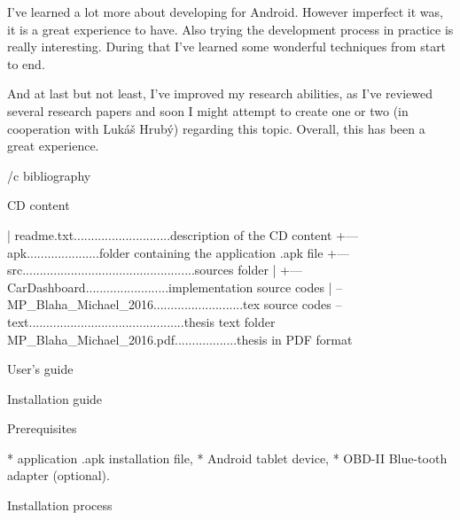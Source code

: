 I've learned a lot more about developing for Android. However imperfect it was, it is a great experience to have. Also trying the  development process in practice is really interesting. During that I've learned some wonderful techniques from start to end.

And at last but not least, I've improved my research abilities, as I've reviewed several research papers and soon I might attempt to create one or two (in cooperation with Luk\' a\v s Hrub\' y) regarding this topic. Overall, this has been a great experience.


\bibchap
\usebbl/c bibliography



\app CD content

\begtt
|   readme.txt............................description of the CD content 
+---apk.....................folder containing the application .apk file
+---src..................................................sources folder
|   +---CarDashboard........................implementation source codes
|   \---MP_Blaha_Michael_2016..........................tex source codes
\---text.............................................thesis text folder
        MP_Blaha_Michael_2016.pdf..................thesis in PDF format
\endtt

\app User's guide

\sec Installation guide

\secc Prerequisites

\begitems
* application .apk installation file,
* Android tablet device,
* OBD-II Blue-tooth adapter (optional).
\enditems

\secc Installation process

